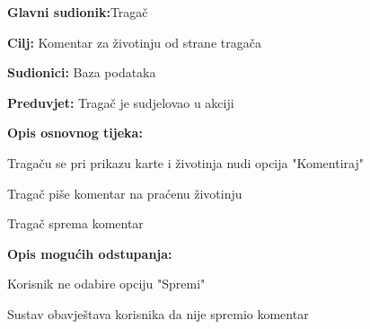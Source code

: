 				\noindent {}
				\begin{packed_item}
					
					\item \textbf{Glavni sudionik:}Tragač
					\item  \textbf{Cilj:} Komentar za životinju od
				 strane tragača
					\item  \textbf{Sudionici:} Baza podataka
					\item  \textbf{Preduvjet:} Tragač je sudjelovao u akciji
					\item  \textbf{Opis osnovnog tijeka:}
					
					\item[] \begin{packed_enum}
					 
						\item Tragaču se pri prikazu karte i životinja	nudi opcija "Komentiraj"
					\item Tragač piše komentar na praćenu životinju
						\item Tragač sprema komentar
					\end{packed_enum}
					
						\item  \textbf{Opis mogućih odstupanja:}
					
					\item[] \begin{packed_item}
						
						\item[4.a]Korisnik ne odabire opciju "Spremi"
						\item[] \begin{packed_enum}
							
							\item Sustav obavještava korisnika da nije spremio komentar
							
						\end{packed_enum}
						
					\end{packed_item}
					
				\end{packed_item}
				
				
				
